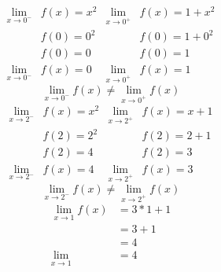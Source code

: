 \documentclass{jhwhw}
\begin{document}
\begin{align*}
    \lim _{x \rightarrow 0^-} & f(x) = x^2 & \lim_{x\to0^+} & f(x) = 1+x^2   \\
                              & f(0) = 0^2 &                & f(0) = 1 + 0^2 \\
                              & f(0) = 0   &                & f(0) = 1       \\
    \lim _{x \rightarrow 0^-} & f(x) = 0   & \lim_{x\to0^+} & f(x) = 1
\end{align*}
\[
    \lim _{x \rightarrow 0^-} f(x) \neq \lim _{x \rightarrow 0^+} f(x)
\]
\begin{align*}
    \lim_{x \to 2^-} & f(x) = x^2 & \lim_{x\to2^+} & f(x) = x + 1 \\
                     & f(2) = 2^2 &                & f(2) = 2 + 1 \\
                     & f(2) = 4   &                & f(2) = 3     \\
    \lim_{x \to 2^-} & f(x) = 4   & \lim_{x\to2^+} & f(x) = 3
\end{align*}
\[
    \lim_{x \to 2^-} f(x) \neq \lim_{x\to2^+} f(x)
\]
\begin{align*}
    \lim_{x \to 1} f(x) & = 3*1+1 \\
                        & = 3 + 1 \\
                        & = 4     \\
    \lim_{x \to 1}      & = 4
\end{align*}
\[\]
\end{document}
